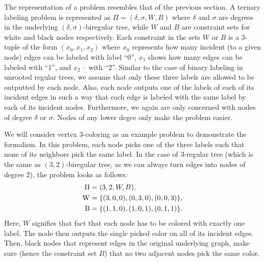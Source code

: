 The representation of a problem resembles that of the previous section. A
ternary labeling problem is represented as $\Pi = (\delta, \sigma, W, B)$
where $\delta$ and $\sigma$ are degrees in the underlying $(\delta, \sigma)$-biregular
tree, while $W$ and $B$ are constraint sets for white and black nodes respectively.
Each constraint in the sets $W$ or $B$ is a 3-tuple of the form $(x_0, x_1, x_2)$
where $x_0$ represents how many incident (to a given node) edges can be labeled with label ``0'',
$x_1$ shows how many edges can be labeled with ``1'', and $x_2$ -- with ``2''. Similar to the case
of binary labeling in unrooted regular trees, we assume that only these three labels are allowed to
be outputted by each node. Also, each node outputs one of the labels of each of its incident edges
in such a way that each edge is labeled with the same label by each of its incident nodes.
Furthermore, we again are only concerned with nodes of degree $\delta$ or $\sigma$. Nodes of
any lower degee only make the problem easier.

We will consider vertex 3-coloring as an example problem to demonstrate the formalism.
In this problem, each node picks one of the three labels such that none of its neighbors
pick the same label. In the case of 3-regular tree (which is the same as $(3, 2)$-biregular tree,
as we can always turn edges into nodes of degree 2), the problem looks as follows:
\begin{align*}
  \Pi &= (3, 2, W, B), \\
  \operatorname{W} &= \{ (3, 0, 0), (0, 3, 0), (0, 0, 3) \}, \\
  \operatorname{B} &= \{ (1, 1, 0), (1, 0, 1), (0, 1, 1) \}.
\end{align*}
Here, $W$ signifies that fact that each node has to be colored with exactly one label. The node then outputs
the single picked color on all of its incident edges. Then, black nodes that represent edges in the
original underlying graph, make sure (hence the constraint set $B$) that no two adjacent nodes
pick the same color.

